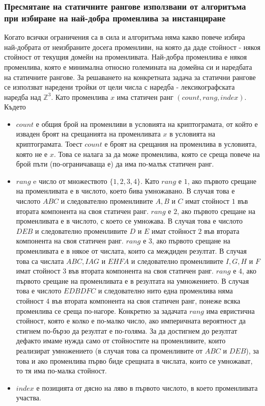 \documentclass[a4paper, 12pt]{article}
\begin{document}
\subsubsection{Пресмятане на статичните рангове използвани от алгоритъма при избиране на най-добра променлива за инстанциране}
Когато всички ограничения са в сила и алгоритъма няма какво повече избира най-добрата от неизбраните досега променливи,
на която да даде стойност - някоя стойност от текущия домейн на променливата.
Най-добра променлива е някоя променлива, която е минимална относно големината на домейна си и наредбата на статичните рангове.
За решаването на конкретната задача за статични рангове се използват наредени тройки от цели числа с наредба - лексикографската наредба над \(\mathbb{Z}^3\).
Като променлива \(x\) има статичен ранг \((count, rang, index)\).
Където
\begin{itemize}
\item \(count\) е общия брой на променливи в условията на криптограмата,
от който е изваден броят на срещанията на променливата \(x\) в условията на криптограмата.
Тоест \(count\) е броят на срещания на променлива в условията, която не е \(x\).
Това се налага за да може променлива, която се среща повече на брой пъти (по-ограничаваща е) да има по-малък статичен ранг.
\item \(rang\) e число от множеството \(\{1, 2, 3, 4\}\).
Като \(rang\) е \(1\), ако първото срещане на променливата е в числото, което бива умножавано.
В случая това е числото \(ABC\) и следователно променливите \(A, B\) и \(C\) имат стойност \(1\) във втората компонента на своя статичен ранг.
\(rang\) е \(2\), ако първото срещане на променливата е в числото, с което се умножава.
В случая това е числото \(DEB\) и следователно променливите \(D\) и \(E\) имат стойност \(2\) във втората компонента на своя статичен ранг.
\(rang\) е \(3\), ако първото срещане на променливата е в някое от числата, които са междиден резултат.
В случая това са числата \(ABC, IAG\) и \(EHFA\) и следователно променливите \(I, G, H\) и \(F\) имат стойност \(3\) във втората компонента на своя статичен ранг.
\(rang\) е \(4\), ако първото срещане на променливата е в резултата на умножението.
В случая това е числото \(EDBDFC\) и следователно нито една променлива няма стойност \(4\) във втората компонента на своя статичен ранг, понеже всяка променлива се среща по-нагоре.
Конкретно за задачата \(rang\) има евристична стойност, която е колко е по-малко число, ако империчната вероятност да стигнем по-бързо да резултат е по-голяма.
За да достигнем до резултат дефакто имаме нужда само от стойностите на променливите, които реализират умножението (в случая това са променливите от \(ABC\) и \(DEB\)),
за това и ако променлива първо биде срещната в числата, които се умножават, то тя има по-малка стойност.
\item \(index\) е позицията от дясно на ляво в първото числото, в което променливата участва.
\end{itemize}
\end{document}

